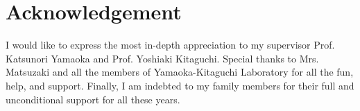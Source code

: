 \chapter*{Acknowledgement}

I would like to express the most in-depth appreciation to my supervisor Prof. Katsunori Yamaoka and Prof. Yoshiaki Kitaguchi.
Special thanks to Mrs. Matsuzaki and all the members of Yamaoka-Kitaguchi Laboratory for all the fun, help, and support.
Finally, I am indebted to my family members for their full and unconditional support for all these years.
